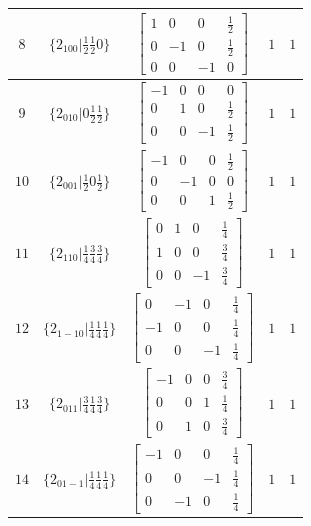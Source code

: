 \documentclass[fleqn,8pt]{jsarticle}
\begin{document}
\begin{longtable}{ccccc}
$ 8 $ & $ \{2{}_{100}|\frac{1}{2} \frac{1}{2} 0\} $ & $ \begin{bmatrix} 1 & 0 & 0 & \frac{1}{2} \\ 0 & -1 & 0 & \frac{1}{2} \\ 0 & 0 & -1 & 0 \end{bmatrix} $ & $ 1 $ & $ 1 $ \\ \hline
$ 9 $ & $ \{2{}_{010}|0 \frac{1}{2} \frac{1}{2}\} $ & $ \begin{bmatrix} -1 & 0 & 0 & 0 \\ 0 & 1 & 0 & \frac{1}{2} \\ 0 & 0 & -1 & \frac{1}{2} \end{bmatrix} $ & $ 1 $ & $ 1 $ \\ \hline
$ 10 $ & $ \{2{}_{001}|\frac{1}{2} 0 \frac{1}{2}\} $ & $ \begin{bmatrix} -1 & 0 & 0 & \frac{1}{2} \\ 0 & -1 & 0 & 0 \\ 0 & 0 & 1 & \frac{1}{2} \end{bmatrix} $ & $ 1 $ & $ 1 $ \\ \hline
$ 11 $ & $ \{2{}_{110}|\frac{1}{4} \frac{3}{4} \frac{3}{4}\} $ & $ \begin{bmatrix} 0 & 1 & 0 & \frac{1}{4} \\ 1 & 0 & 0 & \frac{3}{4} \\ 0 & 0 & -1 & \frac{3}{4} \end{bmatrix} $ & $ 1 $ & $ 1 $ \\ \hline
$ 12 $ & $ \{2{}_{1-10}|\frac{1}{4} \frac{1}{4} \frac{1}{4}\} $ & $ \begin{bmatrix} 0 & -1 & 0 & \frac{1}{4} \\ -1 & 0 & 0 & \frac{1}{4} \\ 0 & 0 & -1 & \frac{1}{4} \end{bmatrix} $ & $ 1 $ & $ 1 $ \\ \hline
$ 13 $ & $ \{2{}_{011}|\frac{3}{4} \frac{1}{4} \frac{3}{4}\} $ & $ \begin{bmatrix} -1 & 0 & 0 & \frac{3}{4} \\ 0 & 0 & 1 & \frac{1}{4} \\ 0 & 1 & 0 & \frac{3}{4} \end{bmatrix} $ & $ 1 $ & $ 1 $ \\ \hline
$ 14 $ & $ \{2{}_{01-1}|\frac{1}{4} \frac{1}{4} \frac{1}{4}\} $ & $ \begin{bmatrix} -1 & 0 & 0 & \frac{1}{4} \\ 0 & 0 & -1 & \frac{1}{4} \\ 0 & -1 & 0 & \frac{1}{4} \end{bmatrix} $ & $ 1 $ & $ 1 $ \\ \hline

\end{longtable}
\end{document}
